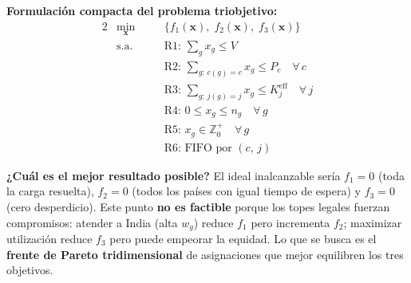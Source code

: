 \documentclass[12pt,letterpaper]{article}
\begin{document}
\begin{formulabox}
\textbf{Formulación compacta del problema triobjetivo:}
\begin{alignat*}{2}
& \min_{\mathbf{x}} \quad && \bigl\{f_1(\mathbf{x}),\; f_2(\mathbf{x}),\; f_3(\mathbf{x})\bigr\} \\
& \text{s.a.} \quad && \text{R1: } \textstyle\sum_{g} x_g \leq V \\
& && \text{R2: } \textstyle\sum_{g:\,c(g)=c} x_g \leq P_c \quad \forall\, c \\
& && \text{R3: } \textstyle\sum_{g:\,j(g)=j} x_g \leq K_j^{\text{eff}} \quad \forall\, j \\
& && \text{R4: } 0 \leq x_g \leq n_g \quad \forall\, g \\
& && \text{R5: } x_g \in \mathbb{Z}^{+}_0 \quad \forall\, g \\
& && \text{R6: FIFO por } (c,\,j)
\end{alignat*}
\end{formulabox}

\begin{yellowbox}
\textbf{¿Cuál es el mejor resultado posible?} El ideal inalcanzable sería $f_1 = 0$ (toda la carga resuelta), $f_2 = 0$ (todos los países con igual tiempo de espera) y $f_3 = 0$ (cero desperdicio). Este punto \textbf{no es factible} porque los topes legales fuerzan compromisos: atender a India (alta $w_g$) reduce $f_1$ pero incrementa $f_2$; maximizar utilización reduce $f_3$ pero puede empeorar la equidad. Lo que se busca es el \textbf{frente de Pareto tridimensional} de asignaciones que mejor equilibren los tres objetivos.
\end{yellowbox}
\end{document}
